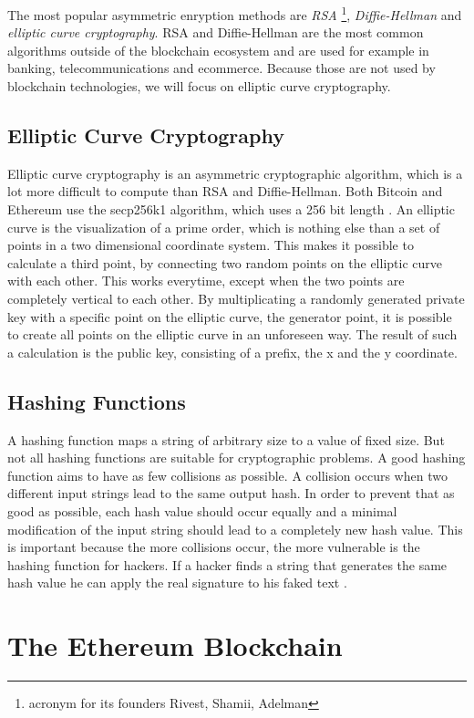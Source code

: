 The most popular asymmetric enryption methods are \textit{RSA} \footnote{acronym for its founders Rivest, Shamii, Adelman}, \textit{Diffie-Hellman} and \textit{elliptic curve cryptography}. RSA and Diffie-Hellman are the most common algorithms outside of the blockchain ecosystem and are used for example in banking, telecommunications and ecommerce. Because those are not used by blockchain technologies, we will focus on elliptic curve cryptography.
\subsection{Elliptic Curve Cryptography}
Elliptic curve cryptography is an asymmetric cryptographic algorithm, which is a lot more difficult to compute than RSA and Diffie-Hellman. Both Bitcoin and
Ethereum use the secp256k1 algorithm, which uses a 256 bit length \cite{secp256k1}. An elliptic curve is the visualization of a prime order, which is nothing else than a set of
points in a two dimensional coordinate system. This makes it possible to calculate a third point, by connecting two random points on the elliptic
curve with each other. This works everytime, except when the two points are completely vertical to each other. By multiplicating a randomly generated private key
with a specific point on the elliptic curve, the generator point, it is possible to create all points on the elliptic curve in an unforeseen way. The result of such a calculation is the public key, consisting of a prefix, the x and the y coordinate.

\subsection{Hashing Functions}
A hashing function maps a string of arbitrary size to a value of fixed size. But not all hashing functions are suitable for cryptographic problems. 
A good hashing function aims to have as few collisions as possible. A collision occurs when two different input strings lead to the same output hash.
In order to prevent that as good as possible, each hash value should occur equally and a minimal modification of the input string should lead to a
completely new hash value. This is important because the more collisions occur, the more vulnerable is the hashing function for hackers. If a hacker
finds a string that generates the same hash value he can apply the real signature to his faked text \cite[pp. 200-201]{Schmeh2007}.

\section{The Ethereum Blockchain}
